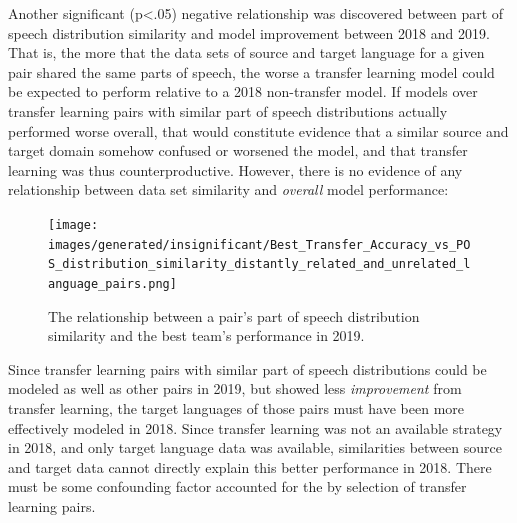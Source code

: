 Another significant (p<.05) negative relationship was discovered between part of speech distribution similarity and model improvement between 2018 and 2019. That is, the more that the data sets of source and target language for a given pair shared the same parts of speech, the worse a transfer learning model could be expected to perform relative to a 2018 non-transfer model. If models over transfer learning pairs with similar part of speech distributions actually performed worse overall, that would constitute evidence that a similar source and target domain somehow confused or worsened the model, and that transfer learning was thus counterproductive. However, there is no evidence of any relationship between data set similarity and \textit{overall} model performance:

\begin{figure}[ht]
\texttt{[image: images/generated/insignificant/Best\_Transfer\_Accuracy\_vs\_POS\_distribution\_similarity\_distantly\_related\_and\_unrelated\_language\_pairs.png]}
\centering
\caption{The relationship between a pair's part of speech distribution similarity and the best team's performance in 2019.}
\end{figure}

Since transfer learning pairs with similar part of speech distributions could be modeled as well as other pairs in 2019, but showed less \textit{improvement} from transfer learning, the target languages of those pairs must have been more effectively modeled in 2018. Since transfer learning was not an available strategy in 2018, and only target language data was available, similarities between source and target data cannot directly explain this better performance in 2018. There must be some confounding factor accounted for the by selection of transfer learning pairs.